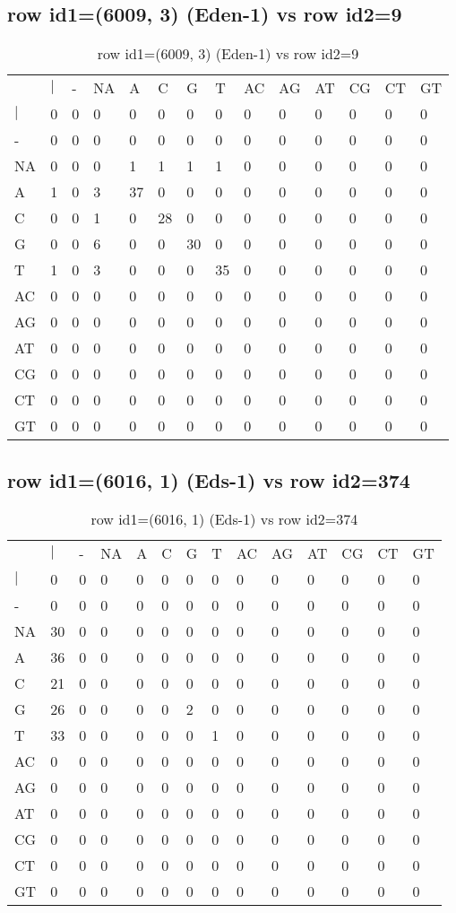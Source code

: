 \subsection{row id1=(6009, 3) (Eden-1) vs row id2=9}
\begin{center}
\begin{longtable}{|l|l|l|l|l|l|l|l|l|l|l|l|l|l|}
\caption{row id1=(6009, 3) (Eden-1) vs row id2=9} \label{table_dm14}\\
\hline
\\
\hline
&$|$&-&NA&A&C&G&T&AC&AG&AT&CG&CT&GT\\
$|$&0&0&0&0&0&0&0&0&0&0&0&0&0\\
-&0&0&0&0&0&0&0&0&0&0&0&0&0\\
NA&0&0&0&1&1&1&1&0&0&0&0&0&0\\
A&1&0&3&37&0&0&0&0&0&0&0&0&0\\
C&0&0&1&0&28&0&0&0&0&0&0&0&0\\
G&0&0&6&0&0&30&0&0&0&0&0&0&0\\
T&1&0&3&0&0&0&35&0&0&0&0&0&0\\
AC&0&0&0&0&0&0&0&0&0&0&0&0&0\\
AG&0&0&0&0&0&0&0&0&0&0&0&0&0\\
AT&0&0&0&0&0&0&0&0&0&0&0&0&0\\
CG&0&0&0&0&0&0&0&0&0&0&0&0&0\\
CT&0&0&0&0&0&0&0&0&0&0&0&0&0\\
GT&0&0&0&0&0&0&0&0&0&0&0&0&0\\
\hline
\end{longtable}
\end{center}

\subsection{row id1=(6016, 1) (Eds-1) vs row id2=374}
\begin{center}
\begin{longtable}{|l|l|l|l|l|l|l|l|l|l|l|l|l|l|}
\caption{row id1=(6016, 1) (Eds-1) vs row id2=374} \label{table_dm16}\\
\hline
\\
\hline
&$|$&-&NA&A&C&G&T&AC&AG&AT&CG&CT&GT\\
$|$&0&0&0&0&0&0&0&0&0&0&0&0&0\\
-&0&0&0&0&0&0&0&0&0&0&0&0&0\\
NA&30&0&0&0&0&0&0&0&0&0&0&0&0\\
A&36&0&0&0&0&0&0&0&0&0&0&0&0\\
C&21&0&0&0&0&0&0&0&0&0&0&0&0\\
G&26&0&0&0&0&2&0&0&0&0&0&0&0\\
T&33&0&0&0&0&0&1&0&0&0&0&0&0\\
AC&0&0&0&0&0&0&0&0&0&0&0&0&0\\
AG&0&0&0&0&0&0&0&0&0&0&0&0&0\\
AT&0&0&0&0&0&0&0&0&0&0&0&0&0\\
CG&0&0&0&0&0&0&0&0&0&0&0&0&0\\
CT&0&0&0&0&0&0&0&0&0&0&0&0&0\\
GT&0&0&0&0&0&0&0&0&0&0&0&0&0\\
\hline
\end{longtable}
\end{center}

